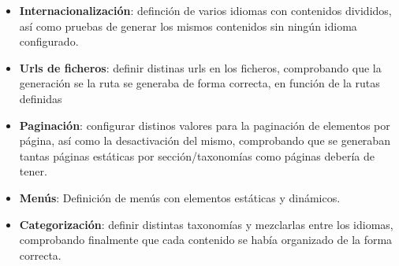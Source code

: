 \begin{itemize}
\item \textbf{Internacionalización}: definción de varios idiomas con contenidos divididos, así como pruebas de generar 
los mismos contenidos sin ningún idioma configurado.
\item \textbf{Urls de ficheros}: definir distinas urls en los ficheros, comprobando que la generación se la ruta
se generaba de forma correcta, en función de la rutas definidas
\item \textbf{Paginación}: configurar distinos valores para la paginación de elementos por página, así como la desactivación
del mismo, comprobando que se generaban tantas páginas estáticas por sección/taxonomías como páginas debería de tener.
\item \textbf{Menús}: Definición de menús con elementos estáticas y dinámicos.
\item \textbf{Categorización}: definir distintas taxonomías y mezclarlas entre los idiomas, comprobando finalmente que cada
contenido se había organizado de la forma correcta.
\end{itemize}
